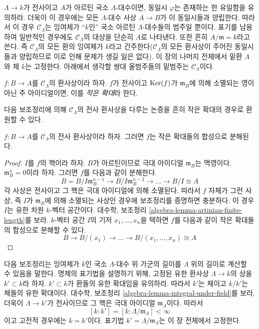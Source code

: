 \noindent
$\Lambda \to k$가 전사이고 $A$가 아르틴 국소 $\Lambda$-대수이면,
동일시 $\varphi$는 존재하는 한 유일함을 유의하라. 더욱이 이 경우에는 모든
$\Lambda$-대수 사상 $A \to B$가 이 동일시들과 양립한다. 따라서 이 경우
$\mathcal{C}_\Lambda$는 잉여체가 ``$k$인'' 국소 아르틴
$\Lambda$-대수들의 범주일 뿐이다. 표기를 남용하여 일반적인 경우에도
$\mathcal{C}_\Lambda$의 대상을 단순히 $A$로 나타낸다. 또한 흔히
$A/\mathfrak m = k$라고 쓴다. 즉 $\mathcal{C}_\Lambda$의 모든 환의
잉여체가 $k$라고 간주한다($\mathcal{C}_\Lambda$의 모든 환사상이 주어진
동일시들과 양립하므로 이로 인해 문제가 생길 일은 없다).
이 장의 나머지 전체에서 밑환 $\Lambda$와 체 $k$는 고정한다.
아래에서 생각할 쌍대 올범주들의 밑범주는 $\mathcal{C}_\Lambda$이다.

\begin{definition}
\label{definition-small-extension}
$f: B \to A$를 $\mathcal{C}_\Lambda$의 환사상이라 하자. $f$가 전사이고
$\mathop{\mathrm{Ker}}(f)$가 $\mathfrak{m}_B$에 의해 소멸되는 영이 아닌 주 아이디얼이면,
이를 {\it 작은 확대}라 한다.
\end{definition}

\noindent
다음 보조정리에 의해 $\mathcal{C}_\Lambda$의 전사 환사상을 다루는 논증을
흔히 작은 확대의 경우로 환원할 수 있다.

\begin{lemma}
\label{lemma-factor-small-extension}
$f: B \to A$를 $\mathcal{C}_\Lambda$의 전사 환사상이라 하자.
그러면 $f$는 작은 확대들의 합성으로 분해된다.
\end{lemma}

\begin{proof}
$I$를 $f$의 핵이라 하자. $B$가 아르틴이므로 극대 아이디얼
$\mathfrak{m}_B$는 멱영이다. $\mathfrak{m}_B^n = 0$이라 하자. 그러면
$f$를 다음과 같이 분해한다.
$$
B = B/I\mathfrak{m}_B^{n-1} \to B/I\mathfrak{m}_B^{n-2} \to
\ldots \to B/I \cong A
$$
각 사상은 전사이고 그 핵은 극대 아이디얼에 의해 소멸된다. 따라서 $f$ 자체가
그런 사상, 즉 $I$가 $\mathfrak{m}_B$에 의해 소멸되는 사상인 경우에 보조정리를
증명하면 충분하다. 이 경우 $I$는 유한 차원 $k$-벡터 공간이다. 대수학,
보조정리 \ref{algebra-lemma-artinian-finite-length}를 보라.
$k$-벡터 공간 $I$의 기저 $x_1, \ldots, x_n$을 택하면
$f$를 다음과 같이 작은 확대들의 합성으로 분해할 수 있다.
$$
B \to B/(x_1) \to \ldots \to  B/(x_1, \ldots, x_n) \cong  A
$$
\end{proof}

\noindent
다음 보조정리는 잉여체가 $k$인 국소 $\Lambda$-대수 위 가군의 길이를
$\Lambda$ 위의 길이로 계산할 수 있음을 말한다. 명제의 표기법을 설명하기 위해,
고정된 유한 환사상 $\Lambda \to k$의 상을 $k' \subset k$라 하자.
$k' \subset k$가 환들의 유한 확대임을 유의하라. 따라서 $k'$는 체이고
$k/k'$는 체들의 유한 확대이다. 대수학, 보조정리
\ref{algebra-lemma-integral-under-field}를 보라.
더욱이 $\Lambda \to k'$가 전사이므로 그 핵은 극대 아이디얼
$\mathfrak m_\Lambda$이다. 따라서
\begin{equation}
\label{equation-k-prime}
[k : k'] = [k : \Lambda/\mathfrak m_\Lambda] < \infty
\end{equation}
이고 고전적 경우에는 $k = k'$이다. 표기법
$k' = \Lambda/\mathfrak m_\Lambda$는 이 장 전체에서 고정한다.

